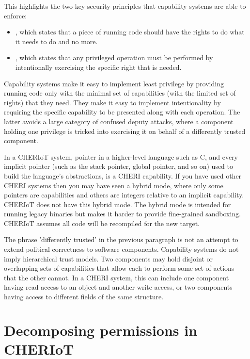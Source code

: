 This highlights the two key security principles that capability systems are able to enforce:

\begin{itemize}
	\item{, which states that a piece of running code should have the rights to do what it needs to do and no more.}
	\item{, which states that any privileged operation must be performed by intentionally exercising the specific right that is needed.}
\end{itemize}

Capability systems make it easy to implement least privilege by providing running code only with the minimal set of capabilities (with the limited set of rights) that they need.
They make it easy to implement intentionality by requiring the specific capability to be presented along with each operation.
The latter avoids a large category of confused deputy attacks, where a component holding one privilege is tricked into exercising it on behalf of a differently trusted component.

\begin{note}
	In a CHERIoT system,  pointer in a higher-level language such as C, and every implicit pointer (such as the stack pointer, global pointer, and so on) used to build the language's abstractions, is a CHERI capability.
	If you have used other CHERI systems then you may have seen a hybrid mode, where only some pointers are capabilities and others are integers relative to an implicit capability.
	CHERIoT does not have this hybrid mode.
	The hybrid mode is intended for running legacy binaries but makes it harder to provide fine-grained sandboxing.
	CHERIoT assumes all code will be recompiled for the new target.
\end{note}

The phrase 'differently trusted' in the previous paragraph is not an attempt to extend political correctness to software components.
Capability systems do not imply hierarchical trust models.
Two components may hold disjoint or overlapping sets of capabilities that allow each to perform some set of actions that the other cannot.
In a CHERI system, this can include one component having read access to an object and another write access, or two components having access to different fields of the same structure.

\section[label=permissions]{Decomposing permissions in CHERIoT}


